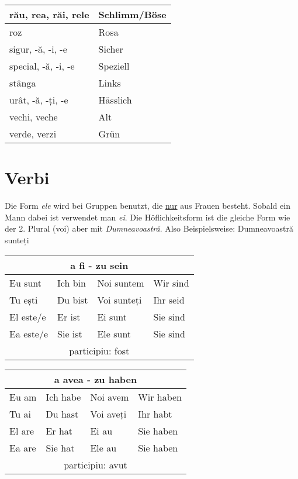 \documentclass[11pt, oneside]{article}
\begin{document}
\begin{center}
\begin{tabular}{ | p{6cm}| p{6cm} | }
    \hline
    rău, rea, răi, rele & Schlimm/Böse\\
    \hline
    roz & Rosa\\
    \hline
    sigur, -ă, -i, -e & Sicher\\
    \hline
    special, -ă, -i, -e & Speziell\\
    \hline
    stânga & Links\\
    \hline
    urât, -ă, -ți, -e & Hässlich\\
    \hline
    vechi, veche & Alt\\
    \hline
    verde, verzi & Grün\\
    \hline
  \end{tabular}
\end{center}

%
%
%
%
%
%
%
%
%
\singlespacing
\newpage
\section{Verbi}
Die Form \emph{ele} wird bei Gruppen benutzt, die \underline{nur} aus 
Frauen besteht. Sobald ein Mann dabei ist verwendet man \emph{ei}. 
Die Höflichkeitsform ist die gleiche Form wie der 2. Plural (voi) aber 
mit \emph{Dumneavoastră}. Also Beispielsweise: Dumneavoastră sunteți
\begin{center}
  \begin{tabular}{ |p{3.25cm}|p{3.25cm}||p{3.25cm}|p{3.25cm}|  }
      \hline
      \multicolumn{4}{|c|}{a fi - zu sein} \\
      \hline
      \hline
      Eu sunt & Ich bin & Noi suntem & Wir sind\\
      \hline
      Tu ești & Du bist & Voi sunteți & Ihr seid\\
      \hline
      El este/e & Er ist & Ei sunt & Sie sind\\ 
      Ea este/e & Sie ist & Ele sunt & Sie sind\\
      \hline
      \multicolumn{4}{|c|}{participiu: fost} \\
      \hline
     \end{tabular}
\end{center}
%
\begin{center}
  \begin{tabular}{ |p{3.25cm}|p{3.25cm}||p{3.25cm}|p{3.25cm}| }
      \hline
      \multicolumn{4}{|c|}{a avea - zu haben} \\
      \hline
      \hline
      Eu am & Ich habe & Noi avem & Wir haben\\
      \hline
      Tu ai & Du hast & Voi aveți & Ihr habt\\
      \hline
      El are & Er hat & Ei au & Sie haben\\ 
      Ea are & Sie hat & Ele au & Sie haben\\
      \hline
      \multicolumn{4}{|c|}{participiu: avut} \\
      \hline
     \end{tabular}
\end{center}
\end{document}

